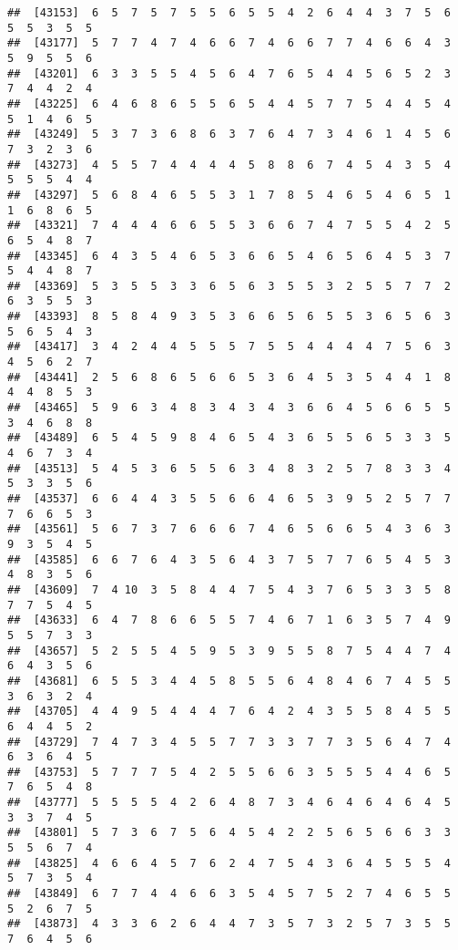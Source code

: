 \documentclass[
]{book}
\begin{document}
\begin{verbatim}
##  [43153]  6  5  7  5  7  5  5  6  5  5  4  2  6  4  4  3  7  5  6  5  5  3  5  5
##  [43177]  5  7  7  4  7  4  6  6  7  4  6  6  7  7  4  6  6  4  3  5  9  5  5  6
##  [43201]  6  3  3  5  5  4  5  6  4  7  6  5  4  4  5  6  5  2  3  7  4  4  2  4
##  [43225]  6  4  6  8  6  5  5  6  5  4  4  5  7  7  5  4  4  5  4  5  1  4  6  5
##  [43249]  5  3  7  3  6  8  6  3  7  6  4  7  3  4  6  1  4  5  6  7  3  2  3  6
##  [43273]  4  5  5  7  4  4  4  4  5  8  8  6  7  4  5  4  3  5  4  5  5  5  4  4
##  [43297]  5  6  8  4  6  5  5  3  1  7  8  5  4  6  5  4  6  5  1  1  6  8  6  5
##  [43321]  7  4  4  4  6  6  5  5  3  6  6  7  4  7  5  5  4  2  5  6  5  4  8  7
##  [43345]  6  4  3  5  4  6  5  3  6  6  5  4  6  5  6  4  5  3  7  5  4  4  8  7
##  [43369]  5  3  5  5  3  3  6  5  6  3  5  5  3  2  5  5  7  7  2  6  3  5  5  3
##  [43393]  8  5  8  4  9  3  5  3  6  6  5  6  5  5  3  6  5  6  3  5  6  5  4  3
##  [43417]  3  4  2  4  4  5  5  5  7  5  5  4  4  4  4  7  5  6  3  4  5  6  2  7
##  [43441]  2  5  6  8  6  5  6  6  5  3  6  4  5  3  5  4  4  1  8  4  4  8  5  3
##  [43465]  5  9  6  3  4  8  3  4  3  4  3  6  6  4  5  6  6  5  5  3  4  6  8  8
##  [43489]  6  5  4  5  9  8  4  6  5  4  3  6  5  5  6  5  3  3  5  4  6  7  3  4
##  [43513]  5  4  5  3  6  5  5  6  3  4  8  3  2  5  7  8  3  3  4  5  3  3  5  6
##  [43537]  6  6  4  4  3  5  5  6  6  4  6  5  3  9  5  2  5  7  7  7  6  6  5  3
##  [43561]  5  6  7  3  7  6  6  6  7  4  6  5  6  6  5  4  3  6  3  9  3  5  4  5
##  [43585]  6  6  7  6  4  3  5  6  4  3  7  5  7  7  6  5  4  5  3  4  8  3  5  6
##  [43609]  7  4 10  3  5  8  4  4  7  5  4  3  7  6  5  3  3  5  8  7  7  5  4  5
##  [43633]  6  4  7  8  6  6  5  5  7  4  6  7  1  6  3  5  7  4  9  5  5  7  3  3
##  [43657]  5  2  5  5  4  5  9  5  3  9  5  5  8  7  5  4  4  7  4  6  4  3  5  6
##  [43681]  6  5  5  3  4  4  5  8  5  5  6  4  8  4  6  7  4  5  5  3  6  3  2  4
##  [43705]  4  4  9  5  4  4  4  7  6  4  2  4  3  5  5  8  4  5  5  6  4  4  5  2
##  [43729]  7  4  7  3  4  5  5  7  7  3  3  7  7  3  5  6  4  7  4  6  3  6  4  5
##  [43753]  5  7  7  7  5  4  2  5  5  6  6  3  5  5  5  4  4  6  5  7  6  5  4  8
##  [43777]  5  5  5  5  4  2  6  4  8  7  3  4  6  4  6  4  6  4  5  3  3  7  4  5
##  [43801]  5  7  3  6  7  5  6  4  5  4  2  2  5  6  5  6  6  3  3  5  5  6  7  4
##  [43825]  4  6  6  4  5  7  6  2  4  7  5  4  3  6  4  5  5  5  4  5  7  3  5  4
##  [43849]  6  7  7  4  4  6  6  3  5  4  5  7  5  2  7  4  6  5  5  5  2  6  7  5
##  [43873]  4  3  3  6  2  6  4  4  7  3  5  7  3  2  5  7  3  5  5  7  6  4  5  6

\end{verbatim}
\end{document}
